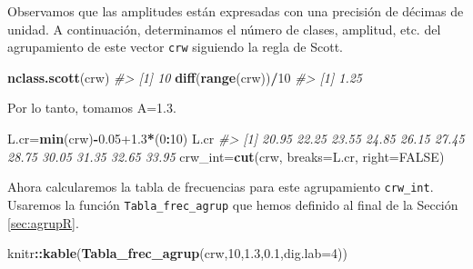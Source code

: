\documentclass[
]{book}
\newenvironment{Shaded}{\begin{snugshade}}{\end{snugshade}}
\newcommand{\CommentTok}[1]{\textcolor[rgb]{0.56,0.35,0.01}{\textit{#1}}}
\newcommand{\DataTypeTok}[1]{\textcolor[rgb]{0.13,0.29,0.53}{#1}}
\newcommand{\DecValTok}[1]{\textcolor[rgb]{0.00,0.00,0.81}{#1}}
\newcommand{\FloatTok}[1]{\textcolor[rgb]{0.00,0.00,0.81}{#1}}
\newcommand{\KeywordTok}[1]{\textcolor[rgb]{0.13,0.29,0.53}{\textbf{#1}}}
\newcommand{\NormalTok}[1]{#1}
\newcommand{\OperatorTok}[1]{\textcolor[rgb]{0.81,0.36,0.00}{\textbf{#1}}}
\newcommand{\OtherTok}[1]{\textcolor[rgb]{0.56,0.35,0.01}{#1}}
\theoremstyle{definition}
\theoremstyle{definition}
\theoremstyle{definition}
\theoremstyle{remark}
\begin{document}
Observamos que las amplitudes están expresadas con una precisión de décimas de unidad.
A continuación, determinamos el número de clases, amplitud, etc. del agrupamiento de este vector \texttt{crw} siguiendo la regla de Scott.

\begin{Shaded}
\begin{Highlighting}[]
\KeywordTok{nclass.scott}\NormalTok{(crw)}
\CommentTok{\#\textgreater{} [1] 10}
\KeywordTok{diff}\NormalTok{(}\KeywordTok{range}\NormalTok{(crw))}\OperatorTok{/}\DecValTok{10}
\CommentTok{\#\textgreater{} [1] 1.25}
\end{Highlighting}
\end{Shaded}

Por lo tanto, tomamos A=1.3.

\begin{Shaded}
\begin{Highlighting}[]
\NormalTok{L.cr=}\KeywordTok{min}\NormalTok{(crw)}\OperatorTok{{-}}\FloatTok{0.05+1.3}\OperatorTok{*}\NormalTok{(}\DecValTok{0}\OperatorTok{:}\DecValTok{10}\NormalTok{)}
\NormalTok{L.cr}
\CommentTok{\#\textgreater{}  [1] 20.95 22.25 23.55 24.85 26.15 27.45 28.75 30.05 31.35 32.65 33.95}
\NormalTok{crw\_int=}\KeywordTok{cut}\NormalTok{(crw, }\DataTypeTok{breaks=}\NormalTok{L.cr, }\DataTypeTok{right=}\OtherTok{FALSE}\NormalTok{)}
\end{Highlighting}
\end{Shaded}

Ahora calcularemos la tabla de frecuencias para este agrupamiento \texttt{crw\_int}. Usaremos la función
\texttt{Tabla\_frec\_agrup} que hemos definido al final de la Sección \ref{sec:agrupR}.

\begin{Shaded}
\begin{Highlighting}[]
\NormalTok{knitr}\OperatorTok{::}\KeywordTok{kable}\NormalTok{(}\KeywordTok{Tabla\_frec\_agrup}\NormalTok{(crw,}\DecValTok{10}\NormalTok{,}\FloatTok{1.3}\NormalTok{,}\FloatTok{0.1}\NormalTok{,}\DataTypeTok{dig.lab=}\DecValTok{4}\NormalTok{))}
\end{Highlighting}
\end{Shaded}
\end{document}
